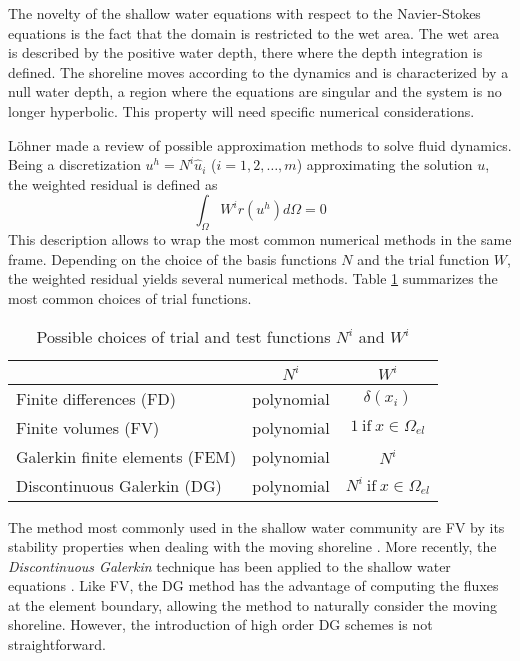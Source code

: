 The novelty of the shallow water equations with respect to the Navier-Stokes equations is the fact that the domain is restricted to the wet area. The wet area is described by the positive water depth, there where the depth integration is defined. The shoreline moves according to the dynamics and is characterized by a null water depth, a region where the equations are singular and the system is no longer hyperbolic. This property will need specific numerical considerations.

Löhner \cite{lohner2008} made a review of possible approximation methods to solve fluid dynamics. Being a discretization $u^h = N^i\hat{u}_i$ ($i=1,2,\dots,m$) approximating the solution $u$, the weighted residual is defined as
\begin{equation*}
\int_{\Omega} W^ir(u^h)d\Omega = 0
\end{equation*}
This description allows to wrap the most common numerical methods in the same frame. Depending on the choice of the basis functions $N$ and the trial function $W$, the weighted residual yields several numerical methods. Table \ref{possible_trial_functions} summarizes the most common choices of trial functions.

\begin{table}
\centering
\begin{tabular}{|l|c|c|}
\hline
 & $N^i$ & $W^i$ \\ \hline
Finite differences (FD)         & polynomial & $\delta(x_i)$ \\ \hline
Finite volumes (FV)             & polynomial & $1 \ \text{if} \ x\in\Omega_{el}$ \\ \hline
Galerkin finite elements (FEM)  & polynomial & $N^i$ \\ \hline
Discontinuous Galerkin (DG)     & polynomial & $N^i \ \text{if} \ x\in\Omega_{el}$ \\ \hline
\end{tabular}
\caption{Possible choices of trial and test functions $N^i$ and $W^i$}
\label{possible_trial_functions}
\end{table}

The method most commonly used in the shallow water community are FV by its stability properties when dealing with the moving shoreline \cite{abbott1978,leveque2002}. More recently, the \emph{Discontinuous Galerkin} technique has been applied to the shallow water equations \cite{ambati2007,khan2014,lee2019}. Like FV, the DG method has the advantage of computing the fluxes at the element boundary, allowing the method to naturally consider the moving shoreline. However, the introduction of high order DG schemes is not straightforward.

